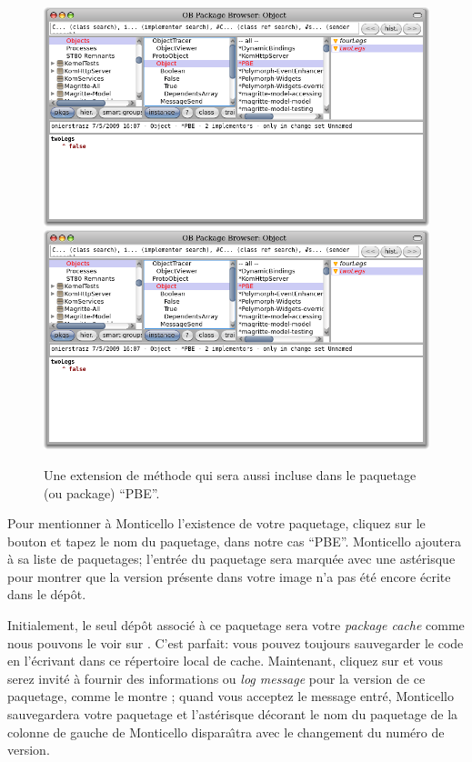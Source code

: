 \documentclass[a4paper,10pt,twoside]{book}
\begin{document}
\begin{figure}[btp]
	\begin{center}
	\ifluluelse
		{\includegraphics[width=\textwidth]{MCnewmethod}}
		{\includegraphics[scale=0.7]{MCnewmethod}}
	\end{center}
	\caption{Une extension de m\'ethode qui sera aussi incluse dans le paquetage (ou package) ``PBE''.}
	\label{fig:MCnewmethod}
\end{figure}

Pour mentionner \`a Monticello l'existence de votre paquetage, 
cliquez sur le bouton  et tapez le nom du paquetage,
dans notre cas ``PBE''.
Monticello ajoutera  \`a sa liste de paquetages;
l'entr\'ee du paquetage sera marqu\'ee avec une ast\'erisque pour
montrer que la version pr\'esente dans votre image n'a pas
\'et\'e encore \'ecrite dans le d\'ep\^ot.

Initialement, le seul d\'ep\^ot associ\'e \`a ce paquetage sera votre
\emph{package cache} comme nous pouvons le voir sur .
C'est parfait: vous pouvez toujours sauvegarder le code en l'\'ecrivant
dans ce r\'epertoire local de cache.
Maintenant, cliquez sur  et vous serez invit\'e \`a
fournir des informations ou \emph{log message} pour la version de ce 
paquetage, comme le montre ; 
quand vous acceptez le message entr\'e, Monticello sauvegardera votre paquetage
et l'ast\'erisque d\'ecorant le nom du paquetage de la colonne de gauche
de Monticello dispara\^{\i}tra avec le changement du num\'ero de version.
\end{document}
